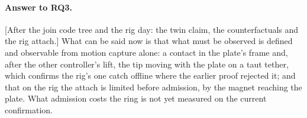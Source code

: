 \paragraph{Answer to RQ3.} [After the join code tree and the rig day: the twin claim, the counterfactuals and the rig
attach.] What can be said now is that what must be observed is defined and observable from motion capture alone: a
contact in the plate's frame and, after the other controller's lift, the tip moving with the plate on a taut tether,
which confirms the rig's one catch offline where the earlier proof rejected it; and that on the rig the attach is
limited before admission, by the magnet reaching the plate. What admission costs the ring is not yet measured on the
current confirmation.
